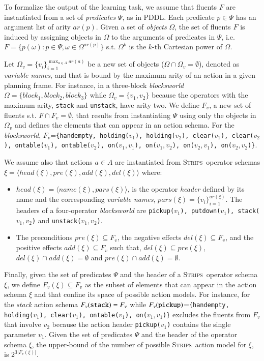 \documentclass[3p,times]{elsarticle}
\newcommand{\strips}{\textsc{Strips}}     %
\newcommand{\tup}[1]{{\langle #1 \rangle}}
\begin{document}
To formalize the output of the learning task, we assume that fluents $F$ are instantiated from a set of {\em predicates} $\Psi$, as in PDDL. Each predicate $p\in\Psi$ has an argument list of arity $ar(p)$. Given a set of {\em objects} $\Omega$, the set of fluents $F$ is induced by assigning objects in $\Omega$ to the arguments of predicates in $\Psi$, i.e.~$F=\{p(\omega):p\in\Psi,\omega\in\Omega^{ar(p)}\}$ s.t. $\Omega^k$ is the $k$-th Cartesian power of $\Omega$.

Let $\Omega_v=\{v_i\}_{i=1}^{\operatorname*{max}_{a\in A} ar(a)}$ be a new set of objects ($\Omega\cap\Omega_v=\emptyset$), denoted as {\em variable names}, and that is bound by the maximum arity of an action in a given planning frame. For instance, in a three-block {\em blocksworld} $\Omega=\{block_1, block_2, block_3\}$ while $\Omega_v=\{v_1, v_2\}$ because the operators with the maximum arity, {\small\tt stack} and {\small\tt unstack}, have arity two. We define $F_v$, a new set of fluents s.t. $F\cap F_v=\emptyset$, that results from instantiating $\Psi$ using only the objects in $\Omega_v$ and defines the elements that can appear in an action schema. For the {\em blocksworld}, $F_v$={\small\tt\{handempty, holding($v_1$), holding($v_2$), clear($v_1$), clear($v_2$), ontable($v_1$), ontable($v_2$), on($v_1,v_1$), on($v_1,v_2$), on($v_2,v_1$), on($v_2,v_2$)\}}.

We assume also that actions $a\in A$ are instantiated from \strips\ operator schemas $\xi=\tup{head(\xi),pre(\xi),add(\xi),del(\xi)}$ where:
\begin{itemize}
\item $head(\xi)=\tup{name(\xi),pars(\xi)}$, is the operator {\em header} defined by its name and the corresponding {\em variable names}, $pars(\xi)=\{v_i\}_{i=1}^{ar(\xi)}$. The headers of a four-operator {\em blocksworld} are {\small\tt pickup($v_1$), putdown($v_1$), stack($v_1,v_2$)} and {\small\tt unstack($v_1,v_2$)}.
\item The preconditions $pre(\xi)\subseteq F_v$, the negative effects $del(\xi)\subseteq F_v$, and the positive effects $add(\xi)\subseteq F_v$ such that, $del(\xi)\subseteq pre(\xi)$, $del(\xi)\cap add(\xi)=\emptyset$ and $pre(\xi)\cap add(\xi)=\emptyset$.
\end{itemize}

Finally, given the set of predicates $\Psi$ and the header of a \strips\ operator schema $\xi$, we define $F_v(\xi)\subseteq F_v$ as the subset of elements that can appear in the action schema $\xi$ and that confine its space of possible action models. For instance, for the {\em stack} action schema $F_v({\tt stack})=F_v$ while $F_v({\tt pickup})$={\small\tt\{handempty, holding($v_1$), clear($v_1$), ontable($v_1$), on($v_1,v_1$)\}} excludes the fluents from $F_v$ that involve $v_2$ because the action header {\small\tt pickup($v_1$)} contains the single parameter $v_1$. Given the set of predicates $\Psi$ and the header of the operator schema $\xi$, the upper-bound of the number of possible \strips\ action model for $\xi$, is $2^{3|F_v(\xi)|}$. 
\end{document}
